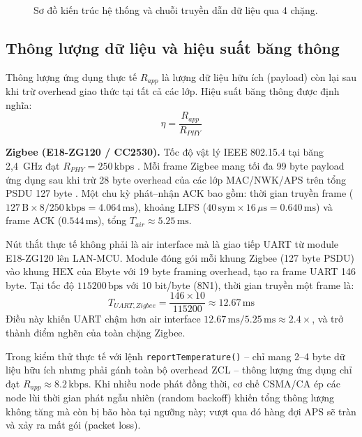 \begin{figure}[htbp]
{
            }
            \caption{Sơ đồ kiến trúc hệ thống và chuỗi truyền dẫn dữ liệu qua 4 chặng.}
            \label{fig:system_architecture}
        \end{figure}

        \subsection{Thông lượng dữ liệu và hiệu suất băng thông}
 
        Thông lượng ứng dụng thực tế $R_{app}$ là lượng dữ liệu hữu ích (payload) còn lại sau khi trừ overhead giao thức tại tất cả các lớp. Hiệu suất băng thông được định nghĩa:
        \begin{equation}
        \eta = \dfrac{R_{app}}{R_{PHY}}
        \end{equation}
        
        \textbf{Zigbee (E18-ZG120 / CC2530).} Tốc độ vật lý IEEE 802.15.4 tại băng 2,4~GHz đạt $R_{PHY} = 250\,\text{kbps}$ \cite{ieee802154_2020}. Mỗi frame Zigbee mang tối đa 99 byte payload ứng dụng sau khi trừ 28 byte overhead của các lớp MAC/NWK/APS trên tổng PSDU 127 byte \cite{zigbee_spec_r21}. Một chu kỳ phát--nhận ACK bao gồm: thời gian truyền frame ($127\,\text{B} \times 8 / 250\,\text{kbps} = 4{.}064\,\text{ms}$), khoảng LIFS ($40\,\text{sym} \times 16\,\mu\text{s} = 0{.}640\,\text{ms}$) và frame ACK ($0{.}544\,\text{ms}$), tổng $T_{air} \approx 5{.}25\,\text{ms}$.
        
        Nút thắt thực tế không phải là air interface mà là giao tiếp UART từ module E18-ZG120 lên LAN-MCU. Module đóng gói mỗi khung Zigbee (127 byte PSDU) vào khung HEX của Ebyte với 19 byte framing overhead, tạo ra frame UART 146 byte. Tại tốc độ $115200\,\text{bps}$ với 10 bit/byte (8N1), thời gian truyền một frame là:
        \[ T_{UART,Zigbee} = \dfrac{146 \times 10}{115200} \approx 12{.}67\,\text{ms} \]
        Điều này khiến UART chậm hơn air interface $12{.}67\,\text{ms} / 5{.}25\,\text{ms} \approx 2{.}4\times$, và trở thành điểm nghẽn của toàn chặng Zigbee.
        
        Trong kiểm thử thực tế với lệnh \texttt{reportTemperature()} -- chỉ mang 2--4 byte dữ liệu hữu ích nhưng phải gánh toàn bộ overhead ZCL -- thông lượng ứng dụng chỉ đạt $R_{app} \approx 8{.}2\,\text{kbps}$. Khi nhiều node phát đồng thời, cơ chế CSMA/CA ép các node lùi thời gian phát ngẫu nhiên (random backoff) khiến tổng thông lượng không tăng mà còn bị bão hòa tại ngưỡng này; vượt qua đó hàng đợi APS sẽ tràn và xảy ra mất gói (packet loss).
        
